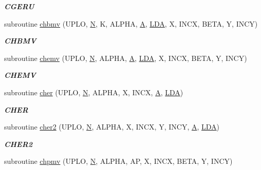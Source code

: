 \begin{DoxyCompactItemize}
\begin{DoxyCompactList}\small\item\em {\bfseries C\+G\+E\+R\+U} \end{DoxyCompactList}\item 
subroutine \hyperlink{group__complex__blas__level2_ga426c198e1c8863d9ecbdbe16efa0f6cf}{chbmv} (U\+P\+L\+O, \hyperlink{polmisc_8c_a0240ac851181b84ac374872dc5434ee4}{N}, K, A\+L\+P\+H\+A, \hyperlink{classA}{A}, \hyperlink{example__user_8c_ae946da542ce0db94dced19b2ecefd1aa}{L\+D\+A}, X, I\+N\+C\+X, B\+E\+T\+A, Y, I\+N\+C\+Y)
\begin{DoxyCompactList}\small\item\em {\bfseries C\+H\+B\+M\+V} \end{DoxyCompactList}\item 
subroutine \hyperlink{group__complex__blas__level2_gac23d51cad7f51484371119bb6e3fb1f3}{chemv} (U\+P\+L\+O, \hyperlink{polmisc_8c_a0240ac851181b84ac374872dc5434ee4}{N}, A\+L\+P\+H\+A, \hyperlink{classA}{A}, \hyperlink{example__user_8c_ae946da542ce0db94dced19b2ecefd1aa}{L\+D\+A}, X, I\+N\+C\+X, B\+E\+T\+A, Y, I\+N\+C\+Y)
\begin{DoxyCompactList}\small\item\em {\bfseries C\+H\+E\+M\+V} \end{DoxyCompactList}\item 
subroutine \hyperlink{group__complex__blas__level2_gafa73370c613ec8f157771992010809ac}{cher} (U\+P\+L\+O, \hyperlink{polmisc_8c_a0240ac851181b84ac374872dc5434ee4}{N}, A\+L\+P\+H\+A, X, I\+N\+C\+X, \hyperlink{classA}{A}, \hyperlink{example__user_8c_ae946da542ce0db94dced19b2ecefd1aa}{L\+D\+A})
\begin{DoxyCompactList}\small\item\em {\bfseries C\+H\+E\+R} \end{DoxyCompactList}\item 
subroutine \hyperlink{group__complex__blas__level2_gaa59d93fbbd8d0b1be4a51634cb437cc1}{cher2} (U\+P\+L\+O, \hyperlink{polmisc_8c_a0240ac851181b84ac374872dc5434ee4}{N}, A\+L\+P\+H\+A, X, I\+N\+C\+X, Y, I\+N\+C\+Y, \hyperlink{classA}{A}, \hyperlink{example__user_8c_ae946da542ce0db94dced19b2ecefd1aa}{L\+D\+A})
\begin{DoxyCompactList}\small\item\em {\bfseries C\+H\+E\+R2} \end{DoxyCompactList}\item 
subroutine \hyperlink{group__complex__blas__level2_gad1dc14308bf0c1c8d9ba6ee068ac4d60}{chpmv} (U\+P\+L\+O, \hyperlink{polmisc_8c_a0240ac851181b84ac374872dc5434ee4}{N}, A\+L\+P\+H\+A, A\+P, X, I\+N\+C\+X, B\+E\+T\+A, Y, I\+N\+C\+Y)

\end{DoxyCompactItemize}
